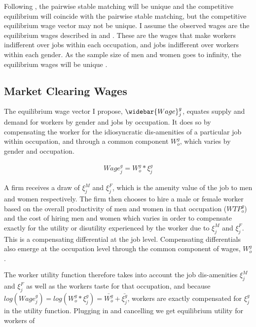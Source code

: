 \documentclass[11pt]{article}
\begin{document}

Following , the pairwise stable matching will be unique and the competitive equilibrium will coincide with the pairwise stable matching, but the competitive equilibrium wage vector may not be unique. I assume the observed wages are the equilibrium wages described in  and . These are the wages that make workers indifferent over jobs within each occupation, and jobs indifferent over workers within each gender. As the sample size of men and women goes to infinity, the equilibrium wages will be unique \cite{Salanie2013a}.

\subsection{Market Clearing Wages}

The equilibrium wage vector I propose,  $\widebar{Wage}^g_j$, equates supply and demand for workers by gender and jobs by occupation. It does so by compensating the worker for the idiosyncratic dis-amenities of a particular job within occupation, and through a common component $W^g_o$, which varies by gender and occupation.

\begin{align}
Wage^g_j = W^g_o * \xi^g_j 
\end{align}


A firm receives a draw of $\xi^M_j$ and $\xi^F_j$, which is the amenity value of the job to men and women respectively. The firm then chooses to hire a male or female worker based on the overall productivity of men and women in that occupation ($WTP^g_o$) and the cost of hiring men and women which varies in order to compensate exactly for the utility or disutility experienced by the worker due to $\xi^M_j$ and $\xi^F_j$. This is a compensating differential at the job level. Compensating differentials also emerge at the occupation level through the common component of wages, $W^g_o$.

The worker utility function therefore takes into account the job dis-amenities $\xi^M_j$ and $\xi^F_j$ as well as the workers taste for that occupation, and because $log(Wage^g_j) = log(W^g_o * \xi^g_j) = \bar{W^g_o} + \bar{\xi^g_j}$, workers are exactly compensated for $ \xi^g_j$ in the utility function. Plugging in and cancelling we get equilibrium utility for workers of
\end{document}
